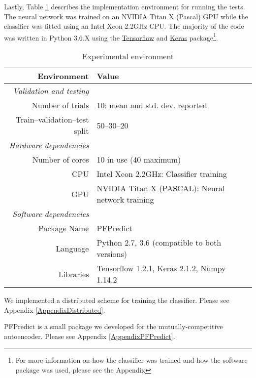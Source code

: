 \par Lastly, Table \ref{exp:implementation} describes the implementation
environment for running the tests. The neural network was trained on an
NVIDIA Titan X (Pascal) GPU while the classifier was fitted using an Intel
Xeon 2.2GHz CPU. The majority of the code was written in Python 3.6.X using
the \href{https://www.tensorflow.org/}{Tensorflow} and
\href{https://keras.io/}{Keras} package\footnote{For more information on how
the classifier was trained and how the software package was used, please see
the Appendix}.

\begin{table}[!h]
  \centering
  \caption{Experimental environment}
  \label{exp:implementation}
  \begin{threeparttable}
  \begin{tabular}{@{}rp{}@{}}
      \toprule
      Environment                    & Value                                             \\ \midrule
      \textit{Validation and testing}                                                    \\
      Number of trials               & 10: mean and std. dev. reported                   \\
      Train--validation--test split  & 50--30--20                                        \\ \cmidrule{1-2}
      \textit{Hardware dependencies}                                                     \\
      Number of cores\tnote{1}       & 10 in use (40 maximum)                            \\
      CPU                            & Intel Xeon 2.2GHz: Classifier training            \\
      GPU                            & NVIDIA Titan X (PASCAL): Neural network training  \\ \cmidrule{1-2} 
      \textit{Software dependencies}                                                     \\
      Package Name                   & PFPredict\tnote{2}                                \\
      Language                & Python 2.7, 3.6 (compatible to both versions)            \\
      Libraries               & Tensorflow 1.2.1, Keras 2.1.2, Numpy 1.14.2              \\ \bottomrule
  \end{tabular}
  \begin{tablenotes}
    \footnotesize
    \item[1] We implemented a distributed scheme for training the classifier.
    Please see Appendix \ref{AppendixDistributed}.
    \item[2] PFPredict is a small package we developed for the mutually-competitive autoencoder.
    Please see Appendix \ref{AppendixPFPredict}.
  \end{tablenotes}
  \end{threeparttable}
\end{table}

